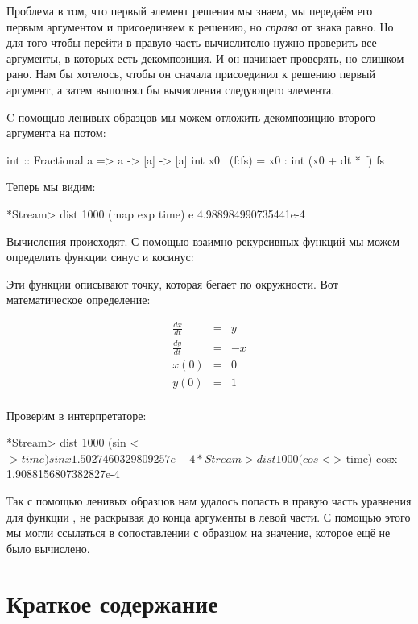 Проблема в том, что первый элемент решения мы знаем, мы передаём его
первым аргументом и присоединяем к решению, но \emph{справа} от знака
равно. Но для того чтобы перейти в правую часть вычислителю нужно
проверить все аргументы, в которых есть декомпозиция. И он начинает
проверять, но слишком рано. Нам бы хотелось, чтобы он сначала
присоединил к решению первый аргумент, а затем выполнял бы вычисления
следующего элемента.

C помощью ленивых образцов мы можем отложить декомпозицию второго
аргумента на потом:


\begin{code}
int :: Fractional a => a -> [a] -> [a]
int x0 ~(f:fs) = x0 : int (x0 + dt * f) fs
\end{code}

Теперь мы видим:


\begin{code}
*Stream> dist 1000 (map exp time) e
4.988984990735441e-4
\end{code}

Вычисления происходят. С помощью взаимно-рекурсивных функций мы можем
определить функции синус и косинус:



Эти функции описывают точку, которая бегает по окружности. Вот
математическое определение:

\begin{eqnarray*}
\frac{dx}{dt}  &=& y \\
\frac{dy}{dt}  &=& - x \\
x(0)           &=& 0 \\
y(0)           &=& 1 \\
\end{eqnarray*}

Проверим в интерпретаторе:


\begin{code}
*Stream> dist 1000 (sin <$> time) sinx
1.5027460329809257e-4
*Stream> dist 1000 (cos <$> time) cosx
1.9088156807382827e-4
\end{code}

Так с помощью ленивых образцов нам удалось попасть в правую часть
уравнения для функции , не раскрывая до конца аргументы в левой
части. С помощью этого мы могли ссылаться в сопоставлении с образцом на
значение, которое ещё не было вычислено.

\section{Краткое содержание}


